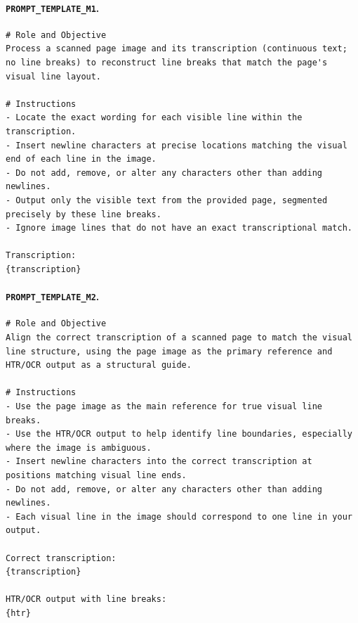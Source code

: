 \paragraph{\texttt{PROMPT\_TEMPLATE\_M1}.}
\begin{lstlisting}[basicstyle=\scriptsize\ttfamily,breaklines=true,columns=fullflexible]
# Role and Objective
Process a scanned page image and its transcription (continuous text; no line breaks) to reconstruct line breaks that match the page's visual line layout.

# Instructions
- Locate the exact wording for each visible line within the transcription.
- Insert newline characters at precise locations matching the visual end of each line in the image.
- Do not add, remove, or alter any characters other than adding newlines.
- Output only the visible text from the provided page, segmented precisely by these line breaks.
- Ignore image lines that do not have an exact transcriptional match.

Transcription:
{transcription}
\end{lstlisting}

\paragraph{\texttt{PROMPT\_TEMPLATE\_M2}.}
\begin{lstlisting}[basicstyle=\scriptsize\ttfamily,breaklines=true,columns=fullflexible]
# Role and Objective
Align the correct transcription of a scanned page to match the visual line structure, using the page image as the primary reference and HTR/OCR output as a structural guide.

# Instructions
- Use the page image as the main reference for true visual line breaks.
- Use the HTR/OCR output to help identify line boundaries, especially where the image is ambiguous.
- Insert newline characters into the correct transcription at positions matching visual line ends.
- Do not add, remove, or alter any characters other than adding newlines.
- Each visual line in the image should correspond to one line in your output.

Correct transcription:
{transcription}

HTR/OCR output with line breaks:
{htr}
\end{lstlisting}


